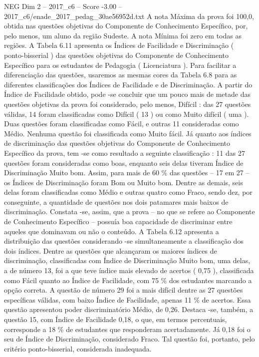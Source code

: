 \begin{textsample}{NEG Dim 2 – 2017\_c6 – Score -3.00 – 2017\_c6/enade\_2017\_pedag\_30ae56952d.txt}
A nota Máxima da prova foi 100,0, obtida nas questões objetivas do Componente de Conhecimento Específico, por, pelo menos, um aluno da região Sudeste.
A nota Mínima foi zero em todas as regiões.
A Tabela 6.11 apresenta os Índices de Facilidade e Discriminação ( ponto-bisserial ) das questões objetivas do Componente de Conhecimento Específico para os estudantes de Pedagogia ( Licenciatura ).
Para facilitar a diferenciação das questões, usaremos as mesmas cores da Tabela 6.8 para as diferentes classificações dos Índices de Facilidade e de Discriminação.
A partir do Índice de Facilidade obtido, pode -se concluir que um pouco mais de metade das questões objetivas da prova foi considerado, pelo menos, Difícil : das 27 questões válidas, 14 foram classificadas como Difícil ( 13 ) ou como Muito difícil ( uma ).
Duas questões foram classificadas como Fácil, e outras 11 consideradas como Médio.
Nenhuma questão foi classificada como Muito fácil.
Já quanto aos índices de discriminação das questões objetivas do Componente de Conhecimento Específico da prova, tem -se como resultado a seguinte classificação : 11 das 27 questões foram consideradas como boas, enquanto seis delas tiveram Índice de Discriminação Muito bom.
Assim, para mais de 60 \% das questões – 17 em 27 – os Índices de Discriminação foram Bom ou Muito bom.
Dentre as demais, seis delas foram classificadas como Médio e outras quatro como Fraco, sendo dez, por conseguinte, a quantidade de questões nos dois patamares mais baixos de discriminação.
Constata -se, assim, que a prova – no que se refere ao Componente de Conhecimento Específico – possuía boa capacidade de discriminar entre aqueles que dominavam ou não o conteúdo.
A Tabela 6.12 apresenta a distribuição das questões considerando -se simultaneamente a classificação dos dois índices.
Dentre as questões que alcançaram os maiores índices de discriminação, classificadas com Índice de Discriminação Muito bom, uma delas, a de número 13, foi a que teve índice mais elevado de acertos ( 0,75 ), classificada como Fácil quanto ao Índice de Facilidade, com 75 \% dos estudantes marcando a opção correta.
A questão de número 29 foi a mais difícil dentre as 27 questões específicas válidas, com baixo Índice de Facilidade, apenas 11 \% de acertos.
Essa questão apresentou poder discriminatório Médio, de 0,26.
Destaca -se, também, a questão 15, com Índice de Facilidade 0,18, o que, em termos percentuais, corresponde a 18 \% de estudantes que responderam acertadamente.
Já 0,18 foi o seu de Índice de Discriminação, considerado Fraco.
Tal questão foi, portanto, pelo critério ponto-bisserial, considerada inadequada.

\end{textsample}
